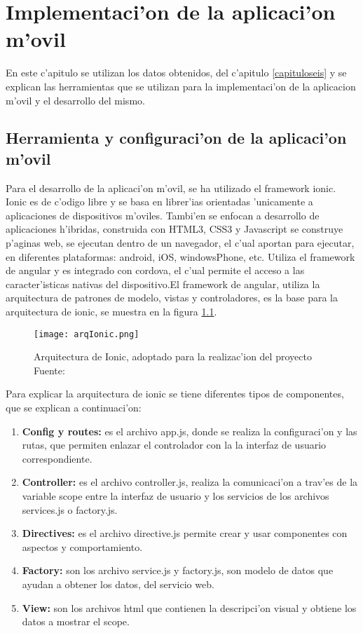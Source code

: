 \chapter{Implementaci'on de la aplicaci'on m'ovil}
\label{capitulosiete}
En este c'apitulo se utilizan los datos obtenidos, del c'apitulo \ref{capituloseis} y se explican las herramientas que se utilizan para la implementaci'on de la aplicacion m'ovil y el desarrollo del mismo.
\section{Herramienta  y configuraci'on de la aplicaci'on m'ovil} 
\label{HerramientaMovil}
Para el desarrollo de la aplicaci'on m'ovil, se ha utilizado el framework ionic.
Ionic es de c'odigo libre y se basa en librer'ias orientadas 'unicamente a aplicaciones de dispositivos m'oviles. Tambi'en se enfocan a desarrollo de aplicaciones h'ibridas, construida con HTML3, CSS3 y Javascript se construye p'aginas web, se ejecutan dentro de un navegador, el c'ual aportan para ejecutar, en diferentes plataformas: android, iOS, windowsPhone, etc. Utiliza el framework de angular y es integrado con cordova, el c'ual permite el acceso a las caracter'isticas nativas del dispositivo.El framework de angular, utiliza la arquitectura de patrones de modelo, vistas y controladores, es la base para la arquitectura de ionic, se muestra en la figura \ref{fig:Ionic}.

\begin{figure}[H]
\centering
 \texttt{[image: arqIonic.png]}
 \captionsetup{justification=centering,margin=2cm}
 \caption{Arquitectura de Ionic, adoptado para la realizac'ion del proyecto Fuente: \cite{Gallego}}
\label{fig:Ionic}
\end{figure}

Para explicar la arquitectura de ionic se tiene diferentes tipos de componentes, que se explican a continuaci'on:

\begin{enumerate}
\item \textbf{Config y routes:} es el archivo app.js, donde se realiza la configuraci'on y las rutas, que permiten enlazar el controlador con la la interfaz de usuario correspondiente.
\item \textbf{Controller:} es el archivo controller.js,  realiza la comunicaci'on a trav'es de la variable scope entre la interfaz de usuario y los servicios de los archivos services.js o factory.js.
\item \textbf{Directives:} es el archivo directive.js permite crear y usar componentes con aspectos y comportamiento.
\item \textbf{Factory:} son los archivo service.js y factory.js, son modelo de datos que ayudan a obtener los datos, del servicio web.
\item \textbf{View:} son los archivos html que contienen la descripci'on visual y obtiene los datos a mostrar el scope.
\end{enumerate}

